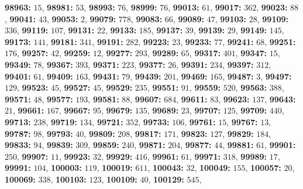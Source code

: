 \textsf{\bfseries 98963:} $15$, \textsf{\bfseries 98981:} $53$, \textsf{\bfseries 98993:} $76$, \textsf{\bfseries 98999:} $76$, \textsf{\bfseries 99013:} $61$, \textsf{\bfseries 99017:} $362$, \textsf{\bfseries 99023:} $88$, \textsf{\bfseries 99041:} $43$, \textsf{\bfseries 99053:} $2$, \textsf{\bfseries 99079:} $778$, \textsf{\bfseries 99083:} $66$, \textsf{\bfseries 99089:} $47$, \textsf{\bfseries 99103:} $28$, \textsf{\bfseries 99109:} $336$, \textsf{\bfseries 99119:} $107$, \textsf{\bfseries 99131:} $22$, \textsf{\bfseries 99133:} $185$, \textsf{\bfseries 99137:} $39$, \textsf{\bfseries 99139:} $29$, \textsf{\bfseries 99149:} $145$, \textsf{\bfseries 99173:} $141$, \textsf{\bfseries 99181:} $341$, \textsf{\bfseries 99191:} $282$, \textsf{\bfseries 99223:} $23$, \textsf{\bfseries 99233:} $77$, \textsf{\bfseries 99241:} $68$, \textsf{\bfseries 99251:} $176$, \textsf{\bfseries 99257:} $42$, \textsf{\bfseries 99259:} $12$, \textsf{\bfseries 99277:} $293$, \textsf{\bfseries 99289:} $65$, \textsf{\bfseries 99317:} $401$, \textsf{\bfseries 99347:} $15$, \textsf{\bfseries 99349:} $78$, \textsf{\bfseries 99367:} $393$, \textsf{\bfseries 99371:} $223$, \textsf{\bfseries 99377:} $26$, \textsf{\bfseries 99391:} $234$, \textsf{\bfseries 99397:} $312$, \textsf{\bfseries 99401:} $61$, \textsf{\bfseries 99409:} $163$, \textsf{\bfseries 99431:} $79$, \textsf{\bfseries 99439:} $201$, \textsf{\bfseries 99469:} $165$, \textsf{\bfseries 99487:} $3$, \textsf{\bfseries 99497:} $129$, \textsf{\bfseries 99523:} $45$, \textsf{\bfseries 99527:} $45$, \textsf{\bfseries 99529:} $235$, \textsf{\bfseries 99551:} $91$, \textsf{\bfseries 99559:} $520$, \textsf{\bfseries 99563:} $388$, \textsf{\bfseries 99571:} $48$, \textsf{\bfseries 99577:} $193$, \textsf{\bfseries 99581:} $88$, \textsf{\bfseries 99607:} $684$, \textsf{\bfseries 99611:} $83$, \textsf{\bfseries 99623:} $137$, \textsf{\bfseries 99643:} $21$, \textsf{\bfseries 99661:} $167$, \textsf{\bfseries 99667:} $95$, \textsf{\bfseries 99679:} $135$, \textsf{\bfseries 99689:} $23$, \textsf{\bfseries 99707:} $125$, \textsf{\bfseries 99709:} $440$, \textsf{\bfseries 99713:} $238$, \textsf{\bfseries 99719:} $134$, \textsf{\bfseries 99721:} $352$, \textsf{\bfseries 99733:} $106$, \textsf{\bfseries 99761:} $15$, \textsf{\bfseries 99767:} $13$, \textsf{\bfseries 99787:} $98$, \textsf{\bfseries 99793:} $40$, \textsf{\bfseries 99809:} $208$, \textsf{\bfseries 99817:} $171$, \textsf{\bfseries 99823:} $127$, \textsf{\bfseries 99829:} $184$, \textsf{\bfseries 99833:} $94$, \textsf{\bfseries 99839:} $309$, \textsf{\bfseries 99859:} $240$, \textsf{\bfseries 99871:} $204$, \textsf{\bfseries 99877:} $44$, \textsf{\bfseries 99881:} $61$, \textsf{\bfseries 99901:} $250$, \textsf{\bfseries 99907:} $11$, \textsf{\bfseries 99923:} $32$, \textsf{\bfseries 99929:} $416$, \textsf{\bfseries 99961:} $61$, \textsf{\bfseries 99971:} $318$, \textsf{\bfseries 99989:} $17$, \textsf{\bfseries 99991:} $104$, \textsf{\bfseries 100003:} $119$, \textsf{\bfseries 100019:} $611$, \textsf{\bfseries 100043:} $32$, \textsf{\bfseries 100049:} $155$, \textsf{\bfseries 100057:} $20$, \textsf{\bfseries 100069:} $338$, \textsf{\bfseries 100103:} $123$, \textsf{\bfseries 100109:} $40$, \textsf{\bfseries 100129:} $545$, 
